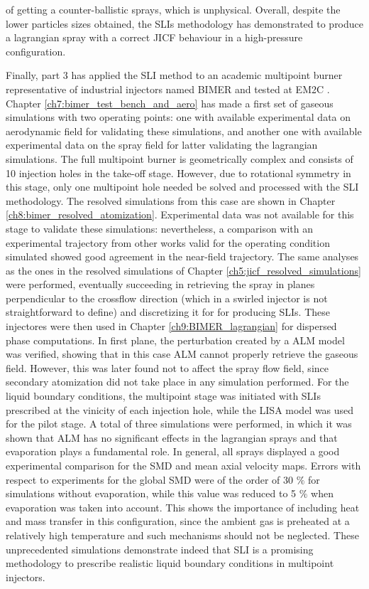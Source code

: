 of getting a counter-ballistic sprays, which is unphysical. Overall, despite the lower particles sizes obtained, the SLIs methodology has demonstrated to produce a lagrangian spray with a correct JICF behaviour in a high-pressure configuration.

\clearpage

Finally, part 3 has applied the SLI method to an academic multipoint burner representative of industrial injectors named BIMER and tested at EM2C . Chapter \ref{ch7:bimer_test_bench_and_aero} has made a first set of gaseous simulations with two operating points: one with available experimental data on aerodynamic field for validating these simulations, and another one with available experimental data on the spray field for latter validating the lagrangian simulations. The full multipoint burner is geometrically complex and consists of 10 injection holes in the take-off stage. However, due to rotational symmetry in this stage, only one multipoint hole needed be solved and processed with the SLI methodology. The resolved simulations from this case are shown in Chapter \ref{ch8:bimer_resolved_atomization}. Experimental data was not available for this stage to validate these simulations: nevertheless, a comparison with an experimental trajectory from other works valid for the operating condition simulated showed good agreement in the near-field trajectory. The same analyses as the ones in the resolved simulations of Chapter \ref{ch5:jicf_resolved_simulations} were performed, eventually succeeding in retrieving the spray in planes perpendicular to the crossflow direction (which in a swirled injector is not straightforward to define) and discretizing it for for producing SLIs. These injectores were then used in Chapter \ref{ch9:BIMER_lagrangian} for dispersed phase computations. In first plane, the perturbation created by a ALM model was verified, showing that in this case ALM cannot properly retrieve the gaseous field. However, this was later found not to affect the spray flow field, since secondary atomization did not take place in any simulation performed. For the liquid boundary conditions, the multipoint stage was initiated with SLIs prescribed at the vinicity of each injection hole, while the LISA model was used for the pilot stage. A total of three simulations were performed, in which it was shown that ALM has no significant effects in the lagrangian sprays and that evaporation plays a fundamental role. In general, all sprays displayed a good experimental comparison for the SMD and mean axial velocity maps. Errors with respect to experiments for the global SMD were of the order of 30 $\%$ for simulations without evaporation, while this value was reduced to 5 $\%$ when evaporation was taken into account. This shows the importance of including heat and mass transfer in this configuration, since the ambient gas is preheated at a relatively high temperature and such mechanisms should not be neglected. These unprecedented simulations demonstrate indeed that SLI is a promising methodology to prescribe realistic liquid boundary conditions in multipoint injectors.

